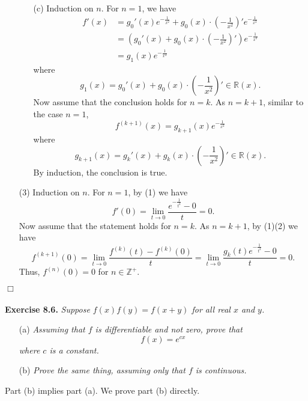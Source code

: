 \documentclass{article}
\begin{document}
\begin{enumerate}
\begin{enumerate}
  \item[(c)]
  Induction on $n$.
  For $n = 1$, we have
  \begin{align*}
    f'(x)
    &= g_0'(x) e^{-\frac{1}{x^2}}
      + g_0(x) \cdot \left( -\frac{1}{x^2} \right)' e^{-\frac{1}{x^2}} \\
    &= \left( g_0'(x) + g_0(x) \cdot \left( -\frac{1}{x^2} \right)' \right) e^{-\frac{1}{x^2}} \\
    &= g_1(x) e^{-\frac{1}{x^2}}
  \end{align*}
  where
  \[
    g_1(x) = g_0'(x) + g_0(x) \cdot \left(-\frac{1}{x^2}\right)' \in \mathbb{R}(x).
  \]
  Now assume that the conclusion holds for $n = k$.
  As $n = k + 1$, similar to the case $n = 1$,
  \[
    f^{(k + 1)}(x) = g_{k + 1}(x) e^{-\frac{1}{x^2}}
  \]
  where
  \[
    g_{k + 1}(x)
    = g_k'(x) + g_k(x) \cdot \left( -\frac{1}{x^2} \right)' \in \mathbb{R}(x).
  \]
  By induction, the conclusion is true.
  \end{enumerate}

\item[(3)]
Induction on $n$.
For $n = 1$, by (1) we have
\[
  f'(0) = \lim_{t \rightarrow 0} \frac{e^{- \frac{1}{t^2}} - 0}{t} = 0.
\]
Now assume that the statement holds for $n = k$.
As $n = k + 1$, by (1)(2) we have
\[
  f^{(k + 1)}(0)
  = \lim_{t \rightarrow 0} \frac{f^{(k)}(t) - f^{(k)}(0)}{t}
  = \lim_{t \rightarrow 0} \frac{g_k(t) e^{- \frac{1}{t^2}} - 0}{t} = 0.
\]
Thus, $f^{(n)}(0) = 0$ for $n \in \mathbb{Z}^+$.
\end{enumerate}
$\Box$ \\\\






\textbf{Exercise 8.6.}
\emph{Suppose $f(x)f(y) = f(x + y)$ for all real $x$ and $y$.}
\begin{enumerate}
\item[(a)]
\emph{Assuming that $f$ is differentiable and not zero, prove that
$$f(x) = e^{cx}$$
where $c$ is a constant.}
\item[(b)]
\emph{Prove the same thing, assuming only that $f$ is continuous.} \\
\end{enumerate}

Part (b) implies part (a). We prove part (b) directly. \\
\end{document}
